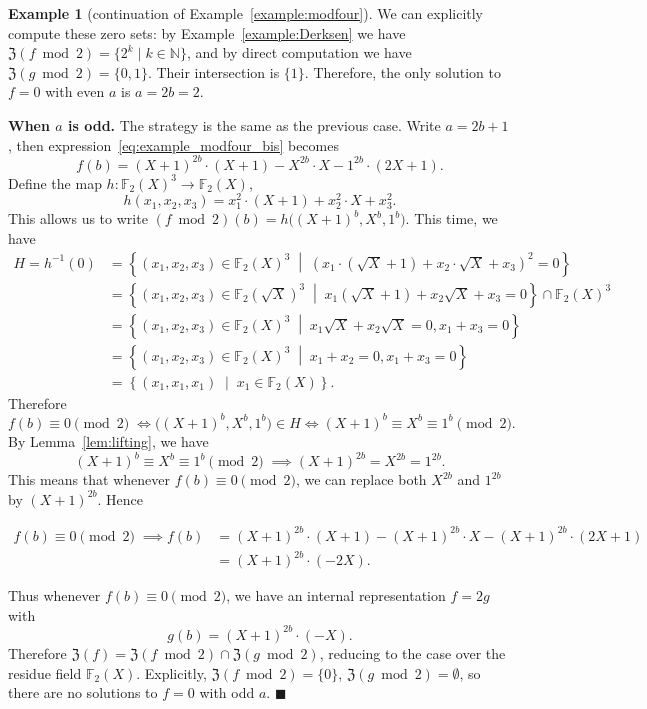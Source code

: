 \documentclass[letterpaper, 11pt, thm-restate]{article}
\numberwithin{equation}{section}
\newcommand{\N}{\mathbb{N}}
\newcommand{\F}{\mathbb{F}}
\newcommand{\mZ}{\mathfrak{Z}}
\theoremstyle{definition}
\theoremstyle{definition}
\newtheorem{example}[theorem]{Example}
\theoremstyle{definition}
\begin{document}
\begin{example}[continuation of Example~\ref{example:modfour}]
    We can explicitly compute these zero sets:
    by Example~\ref{example:Derksen} we have $\mZ(f \bmod 2) = \{2^k \mid k \in \N\}$, and by direct computation we have $\mZ(g \bmod 2) = \{0, 1\}$.
    Their intersection is $\{1\}$.
    Therefore, the only solution to $f = 0$ with even $a$ is $a = 2b = 2$.
    \medskip

    \textbf{When $a$ is odd.} The strategy is the same as the previous case.
    Write $a = 2b+1$, then expression~\eqref{eq:example_modfour_bis} becomes
    \[
    f(b) = (X+1)^{2b} \cdot (X+1) - X^{2b} \cdot X - 1^{2b} \cdot (2X+1).
    \]
    Define the map $h \colon \F_2(X)^3 \rightarrow \F_2(X)$, 
    \[
    h(x_1, x_2, x_3) = x_1^2 \cdot (X+1) + x_2^2 \cdot X + x_3^2.
    \]
    This allows us to write
    $
    (f \bmod 2)(b) = h\big((X+1)^b, X^b, 1^b\big)
    $.
    This time, we have
    \begin{align*}
    H = h^{-1}(0)
    & = \left\{(x_1, x_2, x_3) \in \F_2(X)^3 \;\middle|\; \left(x_1 \cdot (\sqrt{X} + 1) + x_2 \cdot \sqrt{X} + x_3\right)^2 = 0 \right\} \\
    & = \left\{(x_1, x_2, x_3) \in \F_2(\sqrt{X})^3 \;\middle|\; x_1(\sqrt{X} + 1) + x_2 \sqrt{X} + x_3 = 0 \right\} \cap \F_2(X)^3 \\
    & = \left\{(x_1, x_2, x_3) \in \F_2(X)^3 \;\middle|\; x_1\sqrt{X} + x_2 \sqrt{X} = 0, x_1 + x_3 = 0 \right\} \\
    & = \left\{(x_1, x_2, x_3) \in \F_2(X)^3 \;\middle|\; x_1 + x_2 = 0, x_1 + x_3 = 0 \right\} \\
    & = \left\{(x_1, x_1, x_1) \;\middle|\; x_1 \in \F_2(X)\right\}.
    \end{align*}
    Therefore
    \[
    f(b) \equiv 0 \pmod 2 \; \iff \big((X+1)^b, X^b, 1^b\big) \in H \iff (X+1)^b \equiv X^b \equiv 1^b \pmod 2.
    \]
    By Lemma~\ref{lem:lifting}, we have
    \[
    (X+1)^b \equiv X^b \equiv 1^b \pmod 2 \; \implies (X+1)^{2b} = X^{2b} = 1^{2b}.
    \]
    This means that whenever $f(b) \equiv 0 \pmod 2$, we can replace both $X^{2b}$ and $1^{2b}$ by $(X+1)^{2b}$.
    Hence
    \begin{samepage}
    \begin{align*}
    f(b) \equiv 0 \pmod 2 \; \implies f(b) & = (X+1)^{2b} \cdot (X+1) - (X+1)^{2b} \cdot X - (X+1)^{2b} \cdot (2X+1) \\
    & = (X+1)^{2b} \cdot (-2X).
    \end{align*}
    \end{samepage}
    Thus whenever $f(b) \equiv 0 \pmod 2$, we have an internal representation $f = 2g$ with
    \[
    g(b) = (X+1)^{2b} \cdot (-X).
    \]
    Therefore $\mZ(f) = \mZ(f \bmod 2) \cap \mZ(g \bmod 2)$, reducing to the case over the residue field $\F_2(X)$.
    Explicitly, $\mZ(f \bmod 2) = \{0\}$, $\mZ(g \bmod 2) = \emptyset$, so there are no solutions to $f = 0$ with odd $a$.
    \hfill $\blacksquare$
\end{example}
\end{document}
